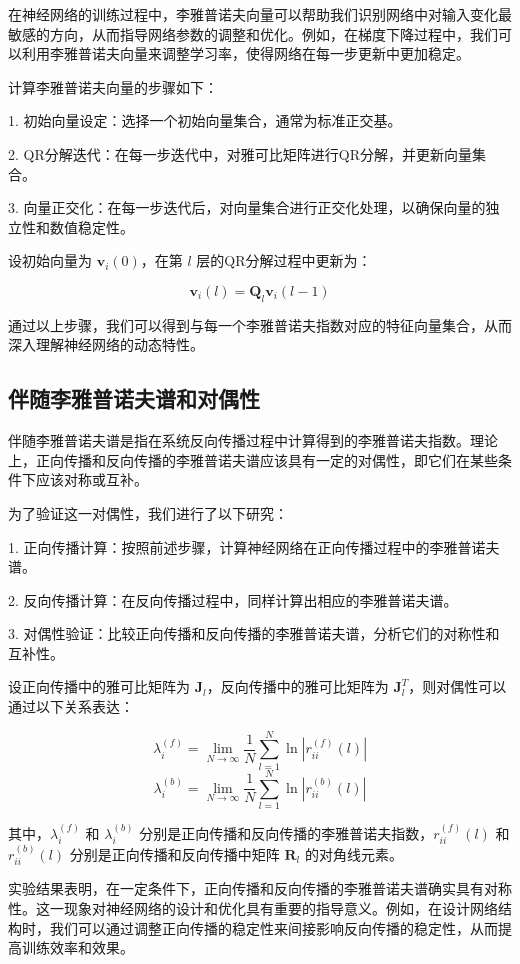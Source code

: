 \documentclass[12pt,a4paper]{amsart}
\begin{document}
在神经网络的训练过程中，李雅普诺夫向量可以帮助我们识别网络中对输入变化最敏感的方向，从而指导网络参数的调整和优化。例如，在梯度下降过程中，我们可以利用李雅普诺夫向量来调整学习率，使得网络在每一步更新中更加稳定。

计算李雅普诺夫向量的步骤如下：

1. 初始向量设定：选择一个初始向量集合，通常为标准正交基。
   
2. QR分解迭代：在每一步迭代中，对雅可比矩阵进行QR分解，并更新向量集合。
   
3. 向量正交化：在每一步迭代后，对向量集合进行正交化处理，以确保向量的独立性和数值稳定性。

设初始向量为 \(\mathbf{v}_i(0)\)，在第 \(l\) 层的QR分解过程中更新为：

\[ \mathbf{v}_i(l) = \mathbf{Q}_l \mathbf{v}_i(l-1) \]

通过以上步骤，我们可以得到与每一个李雅普诺夫指数对应的特征向量集合，从而深入理解神经网络的动态特性。

\subsection{伴随李雅普诺夫谱和对偶性}

伴随李雅普诺夫谱是指在系统反向传播过程中计算得到的李雅普诺夫指数。理论上，正向传播和反向传播的李雅普诺夫谱应该具有一定的对偶性，即它们在某些条件下应该对称或互补。

为了验证这一对偶性，我们进行了以下研究：

1. 正向传播计算：按照前述步骤，计算神经网络在正向传播过程中的李雅普诺夫谱。
   
2. 反向传播计算：在反向传播过程中，同样计算出相应的李雅普诺夫谱。

3. 对偶性验证：比较正向传播和反向传播的李雅普诺夫谱，分析它们的对称性和互补性。

设正向传播中的雅可比矩阵为 \(\mathbf{J}_l\)，反向传播中的雅可比矩阵为 \(\mathbf{J}_l^T\)，则对偶性可以通过以下关系表达：

\[ \lambda_i^{(f)} = \lim_{N \to \infty} \frac{1}{N} \sum_{l=1}^N \ln |r_{ii}^{(f)}(l)| \]
\[ \lambda_i^{(b)} = \lim_{N \to \infty} \frac{1}{N} \sum_{l=1}^N \ln |r_{ii}^{(b)}(l)| \]

其中，\(\lambda_i^{(f)}\) 和 \(\lambda_i^{(b)}\) 分别是正向传播和反向传播的李雅普诺夫指数，\(r_{ii}^{(f)}(l)\) 和 \(r_{ii}^{(b)}(l)\) 分别是正向传播和反向传播中矩阵 \(\mathbf{R}_l\) 的对角线元素。

实验结果表明，在一定条件下，正向传播和反向传播的李雅普诺夫谱确实具有对称性。这一现象对神经网络的设计和优化具有重要的指导意义。例如，在设计网络结构时，我们可以通过调整正向传播的稳定性来间接影响反向传播的稳定性，从而提高训练效率和效果。
\end{document}
